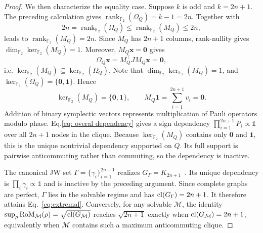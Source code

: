 \documentclass[10pt,aps,pra,twocolumn,floatfix,nofootinbib,superscriptaddress,longbibliography]{revtex4-2}
\newcommand{\Ftwo}{\mathbb F_2}
\newcommand{\Mcal}{\mathcal M}
\newcommand{\RoM}{\mathrm{RoM}}
\providecommand{\mathbm}[1]{\bm{#1}}
\begin{document}
\begin{bibunit}[apsrev4-2]
\begin{proof}
			We then characterize the equality case. Suppose $k$ is odd and $k=2n+1$. The preceding calculation gives $\operatorname{rank}_{\Ftwo}(\Omega_Q)=k-1=2n$. Together with
			\begin{equation}
				\displaystyle
				2n=\operatorname{rank}_{\Ftwo}(\Omega_Q)
				\le\operatorname{rank}_{\Ftwo}(M_Q)
				\le2n,
			\end{equation}
			leads to $\operatorname{rank}_{\Ftwo}(M_Q)=2n$. Since $M_Q$ has $2n+1$ columns, rank-nullity gives $\dim_{\Ftwo}\ker_{\Ftwo}(M_Q)=1$. Moreover, $M_Q\mathbm{x}=\mathbm{0}$ gives
			\begin{equation}
				\displaystyle
				\Omega_Q\mathbm{x}=M_Q^\top J M_Q\mathbm{x}=\mathbm{0},
			\end{equation}
			i.e. $\ker_{\Ftwo}(M_Q)\subseteq\ker_{\Ftwo}(\Omega_Q)$. Note that $\dim_{\Ftwo}\ker_{\Ftwo}(M_Q)=1$, and $\ker_{\Ftwo}(\Omega_Q)=\{\mathbm{0}, \mathbm{1}\}$. Hence
			\begin{equation}\label{eq: overal dependency}
				\displaystyle
				\ker_{\Ftwo}(M_Q)=\{\mathbm{0}, \mathbm{1}\},
				\qquad
				M_Q\mathbm{1}=\sum_{i=1}^{2n+1}v_i=\mathbm{0}.
			\end{equation}
			Addition of binary symplectic vectors represents multiplication of Pauli operators modulo phase. Eq.\eqref{eq: overal dependency} gives a sign dependency $\prod_{i=1}^{2n+1}P_i\propto\mathbb{1}$ over all $2n+1$ nodes in the clique. Because $\ker_{\Ftwo}(M_Q)$ contains only $\mathbm{0}$ and $\mathbm{1}$, this is the unique nontrivial dependency supported on $Q$. Its full support is pairwise anticommuting rather than commuting, so the dependency is inactive.
			
			The canonical JW set $\Gamma=\{\gamma_i\}_{i=1}^{2n+1}$ realizes $G_\Gamma=K_{2n+1}$~\cite{brauer1935spinors,ipek2026phasespace}. Its unique dependency is $\prod_i\gamma_i\propto\mathbb{1}$ and is inactive by the preceding argument. Since complete graphs are perfect, $\Gamma$ lies in the solvable regime and has $\operatorname{cl}(G_\Gamma)=2n+1$. It therefore attains Eq.~\eqref{eq:extremal}. Conversely, for any solvable $\Mcal$, the identity $\sup_\rho\RoM_\Mcal(\rho)=\sqrt{\clnum(G_\Mcal)}$ reaches $\sqrt{2n+1}$ exactly when $\clnum(G_\Mcal)=2n+1$, equivalently when $\Mcal$ contains such a maximum anticommuting clique.
			
		\end{proof}
		
		
		
		
		
			
			

\end{bibunit}
\end{document}
